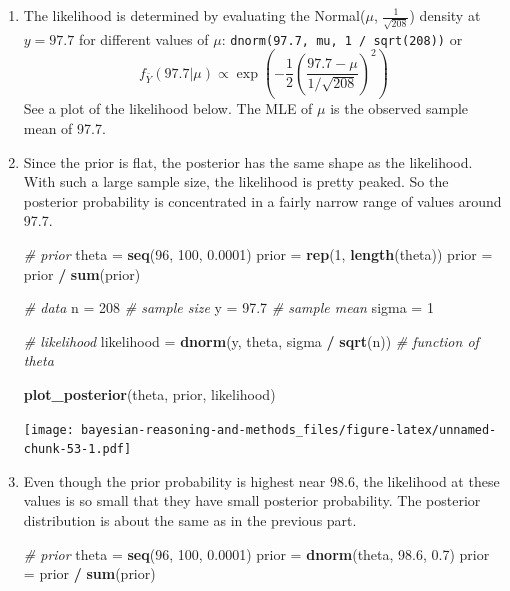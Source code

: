 \documentclass[
]{book}
\newenvironment{Shaded}{\begin{snugshade}}{\end{snugshade}}
\newcommand{\CommentTok}[1]{\textcolor[rgb]{0.56,0.35,0.01}{\textit{#1}}}
\newcommand{\DecValTok}[1]{\textcolor[rgb]{0.00,0.00,0.81}{#1}}
\newcommand{\FloatTok}[1]{\textcolor[rgb]{0.00,0.00,0.81}{#1}}
\newcommand{\KeywordTok}[1]{\textcolor[rgb]{0.13,0.29,0.53}{\textbf{#1}}}
\newcommand{\NormalTok}[1]{#1}
\newcommand{\OperatorTok}[1]{\textcolor[rgb]{0.81,0.36,0.00}{\textbf{#1}}}
\newcommand{\StringTok}[1]{\textcolor[rgb]{0.31,0.60,0.02}{#1}}
\theoremstyle{definition}
\theoremstyle{definition}
\theoremstyle{definition}
\theoremstyle{remark}
\begin{document}
\begin{enumerate}
\def\labelenumi{\arabic{enumi}.}
\item
  The likelihood is determined by evaluating the Normal(\(\mu\), \(\frac{1}{\sqrt{208}}\)) density at \(y=97.7\) for different values of \(\mu\): \texttt{dnorm(97.7,\ mu,\ 1\ /\ sqrt(208))} or
  \[
  f_{\bar{Y}}(97.7|\mu)  \propto \exp\left(-\frac{1}{2}\left(\frac{97.7-\mu}{1/\sqrt{208}}\right)^2\right)
  \] See a plot of the likelihood below. The MLE of \(\mu\) is the observed sample mean of 97.7.
\item
  Since the prior is flat, the posterior has the same shape as the likelihood.
  With such a large sample size, the likelihood is pretty peaked.
  So the posterior probability is concentrated in a fairly narrow range of values around 97.7.

\begin{Shaded}
\begin{Highlighting}[]
\CommentTok{\# prior}
\NormalTok{theta =}\StringTok{ }\KeywordTok{seq}\NormalTok{(}\DecValTok{96}\NormalTok{, }\DecValTok{100}\NormalTok{, }\FloatTok{0.0001}\NormalTok{)}
\NormalTok{prior =}\StringTok{ }\KeywordTok{rep}\NormalTok{(}\DecValTok{1}\NormalTok{, }\KeywordTok{length}\NormalTok{(theta))}
\NormalTok{prior =}\StringTok{ }\NormalTok{prior }\OperatorTok{/}\StringTok{ }\KeywordTok{sum}\NormalTok{(prior)}

\CommentTok{\# data}
\NormalTok{n =}\StringTok{ }\DecValTok{208} \CommentTok{\# sample size}
\NormalTok{y =}\StringTok{ }\FloatTok{97.7} \CommentTok{\# sample mean}
\NormalTok{sigma =}\StringTok{ }\DecValTok{1}

\CommentTok{\# likelihood}
\NormalTok{likelihood =}\StringTok{ }\KeywordTok{dnorm}\NormalTok{(y, theta, sigma }\OperatorTok{/}\StringTok{ }\KeywordTok{sqrt}\NormalTok{(n)) }\CommentTok{\# function of theta}

\KeywordTok{plot\_posterior}\NormalTok{(theta, prior, likelihood)}
\end{Highlighting}
\end{Shaded}

  \texttt{[image: bayesian-reasoning-and-methods\_files/figure-latex/unnamed-chunk-53-1.pdf]}
\item
  Even though the prior probability is highest near 98.6, the likelihood at these values is so small that they have small posterior probability. The posterior distribution is about the same as in the previous part.

\begin{Shaded}
\begin{Highlighting}[]
\CommentTok{\# prior}
\NormalTok{theta =}\StringTok{ }\KeywordTok{seq}\NormalTok{(}\DecValTok{96}\NormalTok{, }\DecValTok{100}\NormalTok{, }\FloatTok{0.0001}\NormalTok{)}
\NormalTok{prior =}\StringTok{ }\KeywordTok{dnorm}\NormalTok{(theta, }\FloatTok{98.6}\NormalTok{, }\FloatTok{0.7}\NormalTok{)}
\NormalTok{prior =}\StringTok{ }\NormalTok{prior }\OperatorTok{/}\StringTok{ }\KeywordTok{sum}\NormalTok{(prior)}


\end{Highlighting}
\end{Shaded}
\end{enumerate}
\end{document}
